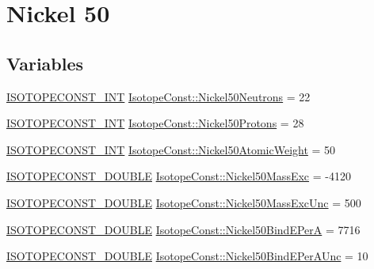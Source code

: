 \hypertarget{group___isotope_const-_nickel-_ni50}{}\section{Nickel 50}
\label{group___isotope_const-_nickel-_ni50}
\subsection*{Variables}
\begin{DoxyCompactItemize}
\item 
\mbox{\hyperlink{group___isotope_const-_macros_ga5f18360b3e99483a35c32d789e62621c}{I\+S\+O\+T\+O\+P\+E\+C\+O\+N\+S\+T\+\_\+\+I\+NT}} \mbox{\hyperlink{group___isotope_const-_nickel-_ni50_gaec70dfb5d4676bb4db97fd1f1ceaf643}{Isotope\+Const\+::\+Nickel50\+Neutrons}} = 22
\item 
\mbox{\hyperlink{group___isotope_const-_macros_ga5f18360b3e99483a35c32d789e62621c}{I\+S\+O\+T\+O\+P\+E\+C\+O\+N\+S\+T\+\_\+\+I\+NT}} \mbox{\hyperlink{group___isotope_const-_nickel-_ni50_gac410a1a03f15515b448653541a03f7f9}{Isotope\+Const\+::\+Nickel50\+Protons}} = 28
\item 
\mbox{\hyperlink{group___isotope_const-_macros_ga5f18360b3e99483a35c32d789e62621c}{I\+S\+O\+T\+O\+P\+E\+C\+O\+N\+S\+T\+\_\+\+I\+NT}} \mbox{\hyperlink{group___isotope_const-_nickel-_ni50_gaa5640cea20bf6835bd30b4554a0245e8}{Isotope\+Const\+::\+Nickel50\+Atomic\+Weight}} = 50
\item 
\mbox{\hyperlink{group___isotope_const-_macros_ga8f45a7272ce02c0b4c65c44636ed719a}{I\+S\+O\+T\+O\+P\+E\+C\+O\+N\+S\+T\+\_\+\+D\+O\+U\+B\+LE}} \mbox{\hyperlink{group___isotope_const-_nickel-_ni50_ga7ff9041b26046959209d3bc258a2732d}{Isotope\+Const\+::\+Nickel50\+Mass\+Exc}} = -\/4120
\item 
\mbox{\hyperlink{group___isotope_const-_macros_ga8f45a7272ce02c0b4c65c44636ed719a}{I\+S\+O\+T\+O\+P\+E\+C\+O\+N\+S\+T\+\_\+\+D\+O\+U\+B\+LE}} \mbox{\hyperlink{group___isotope_const-_nickel-_ni50_ga21b285149249d200c9c36752b3e6b9a2}{Isotope\+Const\+::\+Nickel50\+Mass\+Exc\+Unc}} = 500
\item 
\mbox{\hyperlink{group___isotope_const-_macros_ga8f45a7272ce02c0b4c65c44636ed719a}{I\+S\+O\+T\+O\+P\+E\+C\+O\+N\+S\+T\+\_\+\+D\+O\+U\+B\+LE}} \mbox{\hyperlink{group___isotope_const-_nickel-_ni50_ga21435ec78c1c963f52e87ea57430b90c}{Isotope\+Const\+::\+Nickel50\+Bind\+E\+PerA}} = 7716
\item 
\mbox{\hyperlink{group___isotope_const-_macros_ga8f45a7272ce02c0b4c65c44636ed719a}{I\+S\+O\+T\+O\+P\+E\+C\+O\+N\+S\+T\+\_\+\+D\+O\+U\+B\+LE}} \mbox{\hyperlink{group___isotope_const-_nickel-_ni50_ga7a7a5580cedc0d0b161a84afa5bb164c}{Isotope\+Const\+::\+Nickel50\+Bind\+E\+Per\+A\+Unc}} = 10

\end{DoxyCompactItemize}
